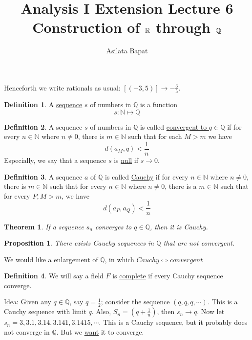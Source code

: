 \documentclass[12pt]{amsart}
\title{Analysis I Extension Lecture 6\\Construction of $\mathbb{R}$ through $\bbQ$}
\author{Asilata Bapat}
\newcommand{\bbN}{\mathbb{N}}
\newcommand{\bbQ}{\mathbb{Q}}
\theoremstyle{plain}
\newtheorem*{prop}{Proposition}
\newtheorem*{thm}{Theorem}
\theoremstyle{remark}
\theoremstyle{definition}
\newtheorem*{define}{Definition}
\begin{document}
\maketitle
{}

Henceforth we write rationals as usual: $[(-3,5)] \rightarrow -\frac{3}{5}$.
\begin{define}
	A \ul{sequence} $s$ of numbers in $\bbQ$ is a function
	\begin{equation*}
		s: \bbN  \mapsto \bbQ
	\end{equation*}
\end{define}

\begin{define}
	A sequence $s$ of numbers in $\bbQ$ is called \ul{convergent to $q\in \bbQ$} if for every $n \in \bbN$ where $n \neq 0$, there is $m\in \bbN$ such that for each $M > m$ we have 
	\begin{equation*}
		d(a_M, q) < \frac{1}{n}
	\end{equation*}
	Especially, we say that a sequence $s$ is \ul{null} if $s \rightarrow 0$.
\end{define}

\begin{define}
	A sequence $a$ of $\bbQ$ is called \ul{Cauchy} if for every $n \in \bbN$ where $n \neq 0$, there is $m \in \bbN$ such that for every $n \in \bbN$ where $n \neq 0$, there is a $m \in \bbN$ such that for every $P,M > m$, we have 
	\begin{equation*}
		d(a_P, a_Q) < \frac{1}{n}
	\end{equation*}
\end{define}

\begin{thm}
	If a sequence $s_n$ converges to $q\in \bbQ$, then  it is Cauchy.
\end{thm}

\begin{prop}
	There exists Cauchy sequences in $\bbQ$ that are not convergent.
\end{prop}

\par
We would like a enlargement of $\bbQ$, in which $Cauchy \iff convergent$
\begin{define}
	We will say a field $F$ is \ul{complete} if every Cauchy sequence converge.
\end{define}

\ul{Idea}: Given any $q\in \bbQ$, say $q = \frac{1}{2}$; consider the sequence $(q,q,q,\cdots)$. This is a Cauchy sequence with limit $q$.
Also, $S_n = (q + \frac{1}{n})$, then $s_n \rightarrow q$.
\newline
Now let $s_n = 3,3.1,3.14,3.141,3.1415,\cdots$. This is a Cauchy sequence, but it probably does not converge in $\bbQ$. But we \ul{want} it to converge.
\end{document}
